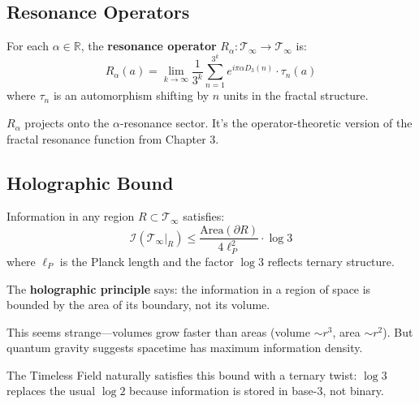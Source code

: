 \subsection{Resonance Operators}

\begin{defn}\label{def:resonance-operator}
For each $\alpha \in \mathbb{R}$, the \textbf{resonance operator} $R_\alpha: \mathcal{T}_\infty \to \mathcal{T}_\infty$ is:
\begin{equation}
R_\alpha(a) = \lim_{k \to \infty} \frac{1}{3^k} \sum_{n=1}^{3^k} e^{i\pi\alpha D_3(n)} \cdot \tau_n(a)
\end{equation}
where $\tau_n$ is an automorphism shifting by $n$ units in the fractal structure.
\end{defn}

$R_\alpha$ projects onto the $\alpha$-resonance sector. It's the operator-theoretic version of the fractal resonance function from Chapter 3.

\subsection{Holographic Bound}

\begin{proposition}\label{prop:holographic}
Information in any region $R \subset \mathcal{T}_\infty$ satisfies:
\begin{equation}
\mathcal{I}(\mathcal{T}_\infty|_R) \leq \frac{\text{Area}(\partial R)}{4\ell_P^2} \cdot \log 3
\end{equation}
where $\ell_P$ is the Planck length and the factor $\log 3$ reflects ternary structure.
\end{proposition}

\begin{intuitive}
The \textbf{holographic principle}\cite{susskind_world_1995} says: the information in a region of space is bounded by the area of its boundary, not its volume.

This seems strange—volumes grow faster than areas (volume $\sim r^3$, area $\sim r^2$). But quantum gravity suggests spacetime has maximum information density.

The Timeless Field naturally satisfies this bound with a ternary twist: $\log 3$ replaces the usual $\log 2$ because information is stored in base-3, not binary.
\end{intuitive}

